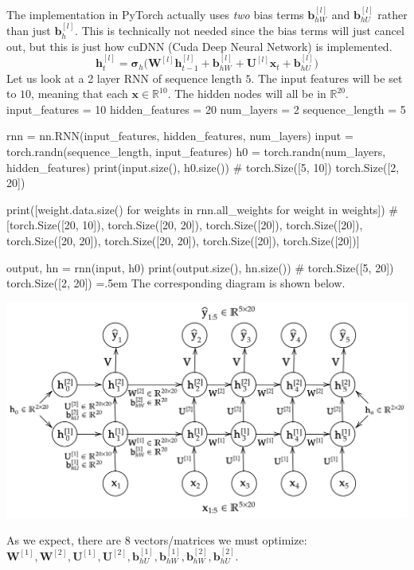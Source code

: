 \documentclass{article}
\newenvironment{cverbatim}
    {\SaveVerbatim{cverb}}
    {\endSaveVerbatim
      \flushleft\fboxrule=0pt\fboxsep=.5em
      \colorbox{cverbbg}{%
        \makebox[\dimexpr\linewidth-2\fboxsep][l]{\BUseVerbatim{cverb}}%
      }
      \endflushleft
  }
\begin{document}
      The implementation in PyTorch actually uses \textit{two} bias terms $\mathbf{b}_{hW}^{[l]}$ and $\mathbf{b}_{hU}^{[l]}$ rather than just $\mathbf{b}_h^{[l]}$. This is technically not needed since the bias terms will just cancel out, but this is just how cuDNN (Cuda Deep Neural Network) is implemented. 
      \[\mathbf{h}_t^{[l]} = \boldsymbol{\sigma}_h \big( \mathbf{W}^{[l]} \mathbf{h}_{t-1}^{[l]} + \mathbf{b}_{hW}^{[l]} + \mathbf{U}^{[l]} \mathbf{x}_t + \mathbf{b}_{hU}^{[l]} \big) \]
      Let us look at a 2 layer RNN of sequence length $5$. The input features will be set to $10$, meaning that each $\mathbf{x} \in \mathbb{R}^{10}$. The hidden nodes will all be in $\mathbb{R}^{20}$. 
      \begin{cverbatim}
      input_features = 10
      hidden_features = 20
      num_layers = 2
      sequence_length = 5

      rnn = nn.RNN(input_features, hidden_features, num_layers)
      input = torch.randn(sequence_length, input_features)
      h0 = torch.randn(num_layers, hidden_features)
      print(input.size(), h0.size()) 
      # torch.Size([5, 10]) torch.Size([2, 20])

      print([weight.data.size() for weights in rnn.all_weights for weight in weights])
      # [torch.Size([20, 10]), torch.Size([20, 20]), torch.Size([20]), torch.Size([20]), 
      torch.Size([20, 20]), torch.Size([20, 20]), torch.Size([20]), torch.Size([20])]
              
      output, hn = rnn(input, h0) 
      print(output.size(), hn.size())
      # torch.Size([5, 20]) torch.Size([2, 20])
      \end{cverbatim}
      The corresponding diagram is shown below. 
      \begin{center}
          \includegraphics[scale=0.3]{img/04_RNN/PyTorch_RNN.png}
      \end{center}
      As we expect, there are 8 vectors/matrices we must optimize: $\mathbf{W}^{[1]}, \mathbf{W}^{[2]}, \mathbf{U}^{[1]}, \mathbf{U}^{[2]}, \mathbf{b}^{[1]}_{hU}, \mathbf{b}^{[1]}_{hW}, \mathbf{b}^{[2]}_{hW}, \mathbf{b}^{[2]}_{hU}$. 
\end{document}
